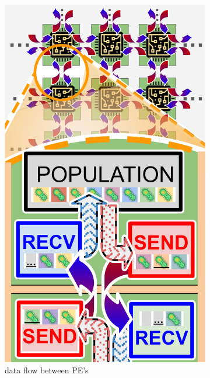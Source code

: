 \begin{figure}[t!]
  \centering
  \begin{subfigure}{0.5\linewidth}
    \centering
    \footnotesize
    \includegraphics[width=0.8\linewidth]{img/dataflow-schematic}
    \vspace{-0.05in}
    \caption{data flow between PE's}
  \end{subfigure}%
  \begin{subfigure}{0.5\linewidth}
    \footnotesize
    \centering

\end{subfigure}
\end{figure}
